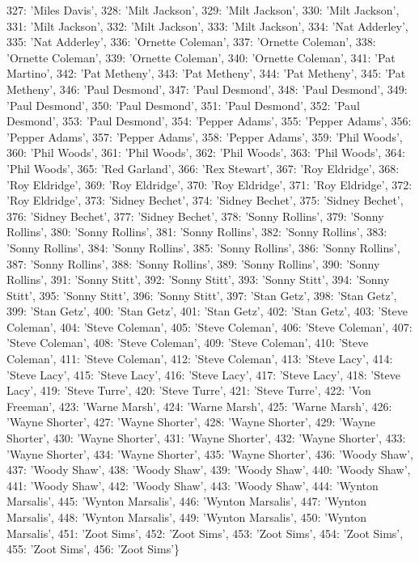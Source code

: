 \documentclass[letterpaper,10pt,english]{sphinxmanual}
\begin{document}
{\begin{sphinxVerbatim}[commandchars=\\\{\}]
 327: 'Miles Davis',
 328: 'Milt Jackson',
 329: 'Milt Jackson',
 330: 'Milt Jackson',
 331: 'Milt Jackson',
 332: 'Milt Jackson',
 333: 'Milt Jackson',
 334: 'Nat Adderley',
 335: 'Nat Adderley',
 336: 'Ornette Coleman',
 337: 'Ornette Coleman',
 338: 'Ornette Coleman',
 339: 'Ornette Coleman',
 340: 'Ornette Coleman',
 341: 'Pat Martino',
 342: 'Pat Metheny',
 343: 'Pat Metheny',
 344: 'Pat Metheny',
 345: 'Pat Metheny',
 346: 'Paul Desmond',
 347: 'Paul Desmond',
 348: 'Paul Desmond',
 349: 'Paul Desmond',
 350: 'Paul Desmond',
 351: 'Paul Desmond',
 352: 'Paul Desmond',
 353: 'Paul Desmond',
 354: 'Pepper Adams',
 355: 'Pepper Adams',
 356: 'Pepper Adams',
 357: 'Pepper Adams',
 358: 'Pepper Adams',
 359: 'Phil Woods',
 360: 'Phil Woods',
 361: 'Phil Woods',
 362: 'Phil Woods',
 363: 'Phil Woods',
 364: 'Phil Woods',
 365: 'Red Garland',
 366: 'Rex Stewart',
 367: 'Roy Eldridge',
 368: 'Roy Eldridge',
 369: 'Roy Eldridge',
 370: 'Roy Eldridge',
 371: 'Roy Eldridge',
 372: 'Roy Eldridge',
 373: 'Sidney Bechet',
 374: 'Sidney Bechet',
 375: 'Sidney Bechet',
 376: 'Sidney Bechet',
 377: 'Sidney Bechet',
 378: 'Sonny Rollins',
 379: 'Sonny Rollins',
 380: 'Sonny Rollins',
 381: 'Sonny Rollins',
 382: 'Sonny Rollins',
 383: 'Sonny Rollins',
 384: 'Sonny Rollins',
 385: 'Sonny Rollins',
 386: 'Sonny Rollins',
 387: 'Sonny Rollins',
 388: 'Sonny Rollins',
 389: 'Sonny Rollins',
 390: 'Sonny Rollins',
 391: 'Sonny Stitt',
 392: 'Sonny Stitt',
 393: 'Sonny Stitt',
 394: 'Sonny Stitt',
 395: 'Sonny Stitt',
 396: 'Sonny Stitt',
 397: 'Stan Getz',
 398: 'Stan Getz',
 399: 'Stan Getz',
 400: 'Stan Getz',
 401: 'Stan Getz',
 402: 'Stan Getz',
 403: 'Steve Coleman',
 404: 'Steve Coleman',
 405: 'Steve Coleman',
 406: 'Steve Coleman',
 407: 'Steve Coleman',
 408: 'Steve Coleman',
 409: 'Steve Coleman',
 410: 'Steve Coleman',
 411: 'Steve Coleman',
 412: 'Steve Coleman',
 413: 'Steve Lacy',
 414: 'Steve Lacy',
 415: 'Steve Lacy',
 416: 'Steve Lacy',
 417: 'Steve Lacy',
 418: 'Steve Lacy',
 419: 'Steve Turre',
 420: 'Steve Turre',
 421: 'Steve Turre',
 422: 'Von Freeman',
 423: 'Warne Marsh',
 424: 'Warne Marsh',
 425: 'Warne Marsh',
 426: 'Wayne Shorter',
 427: 'Wayne Shorter',
 428: 'Wayne Shorter',
 429: 'Wayne Shorter',
 430: 'Wayne Shorter',
 431: 'Wayne Shorter',
 432: 'Wayne Shorter',
 433: 'Wayne Shorter',
 434: 'Wayne Shorter',
 435: 'Wayne Shorter',
 436: 'Woody Shaw',
 437: 'Woody Shaw',
 438: 'Woody Shaw',
 439: 'Woody Shaw',
 440: 'Woody Shaw',
 441: 'Woody Shaw',
 442: 'Woody Shaw',
 443: 'Woody Shaw',
 444: 'Wynton Marsalis',
 445: 'Wynton Marsalis',
 446: 'Wynton Marsalis',
 447: 'Wynton Marsalis',
 448: 'Wynton Marsalis',
 449: 'Wynton Marsalis',
 450: 'Wynton Marsalis',
 451: 'Zoot Sims',
 452: 'Zoot Sims',
 453: 'Zoot Sims',
 454: 'Zoot Sims',
 455: 'Zoot Sims',
 456: 'Zoot Sims'\}
\end{sphinxVerbatim}
}
\end{document}
